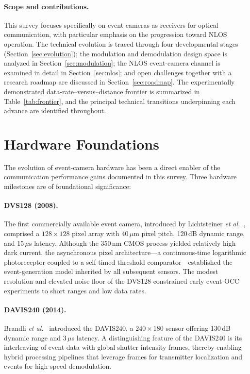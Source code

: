 \documentclass[10pt,a4paper]{article}
\begin{document}
\paragraph{Scope and contributions.}
This survey focuses specifically on event cameras as receivers for
optical communication, with particular emphasis on the progression
toward NLOS operation. The technical evolution is traced through four
developmental stages (Section~\ref{sec:evolution}); the modulation and
demodulation design space is analyzed in Section~\ref{sec:modulation};
the NLOS event-camera channel is examined in detail in
Section~\ref{sec:nlos}; and open challenges together with a research
roadmap are discussed in Section~\ref{sec:roadmap}. The experimentally
demonstrated data-rate--versus--distance frontier is summarized in
Table~\ref{tab:frontier}, and the principal technical transitions
underpinning each advance are identified throughout.

\section{Hardware Foundations}
\label{sec:hardware}

The evolution of event-camera hardware has been a direct enabler of the
communication performance gains documented in this survey. Three hardware
milestones are of foundational significance:

\paragraph{DVS128 (2008).}
The first commercially available event camera, introduced by Lichtsteiner
\emph{et al.}~\cite{lichtsteiner2008dvs}, comprised a $128\times128$
pixel array with 40\,$\mu$m pixel pitch, 120\,dB dynamic range, and
15\,$\mu$s latency. Although the $350$\,nm CMOS process yielded
relatively high dark current, the asynchronous pixel architecture---a
continuous-time logarithmic photoreceptor coupled to a self-timed
threshold comparator---established the event-generation model inherited
by all subsequent sensors. The modest resolution and elevated noise
floor of the DVS128 constrained early event-OCC experiments to short
ranges and low data rates.

\paragraph{DAVIS240 (2014).}
Brandli \emph{et al.}~\cite{brandli2014davis240} introduced the
DAVIS240, a $240\times180$ sensor offering 130\,dB dynamic range and
3\,$\mu$s latency. A distinguishing feature of the DAVIS240 is its
interleaving of event data with global-shutter intensity frames, thereby
enabling hybrid processing pipelines that leverage frames for
transmitter localization and events for high-speed demodulation.
\end{document}
